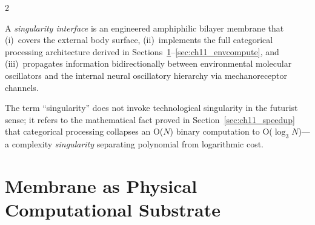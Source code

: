 \begin{multicols}{2}
\begin{definition}
\label{def:singularity_interface}
A \emph{singularity interface} is an engineered amphiphilic bilayer membrane that (i)~covers the external body surface, (ii)~implements the full categorical processing architecture derived in Sections~\ref{sec:ch11_substrate}--\ref{sec:ch11_envcompute}, and (iii)~propagates information bidirectionally between environmental molecular oscillators and the internal neural oscillatory hierarchy via mechanoreceptor channels.
\end{definition}

The term ``singularity'' does not invoke technological singularity in the futurist sense; it refers to the mathematical fact proved in Section~\ref{sec:ch11_speedup} that categorical processing collapses an O($N$) binary computation to O($\log_3 N$)---a complexity \emph{singularity} separating polynomial from logarithmic cost.

\end{multicols}

\section{Membrane as Physical Computational Substrate}
\label{sec:ch11_substrate}

